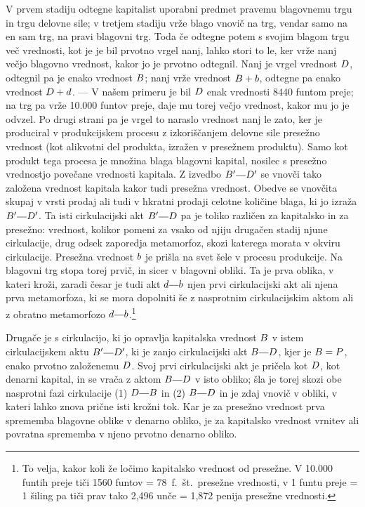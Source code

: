 \documentclass[kapital_02.tex]{subfiles}
\begin{document}
V prvem stadiju odtegne kapitalist uporabni predmet pravemu blagovnemu trgu in trgu delovne sile; v tretjem stadiju vrže blago vnovič na trg, vendar samo na en sam trg, na pravi blagovni trg. Toda če odtegne potem s svojim blagom trgu več vrednosti, kot je je bil prvotno vrgel nanj, lahko stori to le, ker vrže nanj večjo blagovno vrednost, kakor jo je prvotno odtegnil. Nanj je vrgel vrednost \(D\), odtegnil pa je enako vrednost \(B\); nanj vrže vrednost \(B + b\), odtegne pa enako vrednost \(D + d\). --- V našem primeru je bil \(D\) enak vrednosti 8440 funtom preje; na trg pa vrže 10.000 funtov preje, daje mu torej večjo vrednost, kakor mu jo je odvzel. Po drugi strani pa je vrgel to naraslo vrednost nanj le zato, ker je produciral v produkcijskem procesu z izkoriščanjem delovne sile presežno vrednost (kot alikvotni del produkta, izražen v presežnem produktu). Samo kot produkt tega procesa je množina blaga blagovni kapital, nosilec s presežno vrednostjo povečane vrednosti kapitala. Z izvedbo \(\KPEB'\KPEcrta\KPED'\) se vnovči tako založena vrednost kapitala kakor tudi presežna vrednost. Obedve se vnovčita skupaj v vrsti prodaj ali tudi v hkratni prodaji celotne količine blaga, ki jo izraža \(\KPEB'\KPEcrta\KPED'\). Ta isti cirkulacijski akt \(\KPEB'\KPEcrta\KPED\) pa je toliko različen za kapitalsko in za presežno: vrednost, kolikor pomeni za vsako od njiju drugačen stadij njune cirkulacije, drug odsek zaporedja metamorfoz, skozi katerega morata v okviru cirkulacije. Presežna vrednost \(b\) je prišla na svet šele v procesu produkcije. Na blagovni trg stopa torej prvič, in sicer v blagovni obliki. Ta je prva oblika, v kateri kroži, zaradi česar je tudi akt \(\KPEd\KPEcrta\KPEb\) njen prvi cirkulacijski akt ali njena prva metamorfoza, ki se mora dopolniti še z nasprotnim cirkulacijskim aktom ali z obratno metamorfozo \(\KPEd\KPEcrta\KPEb\).\footnote{To velja, kakor koli že ločimo kapitalsko vrednost od presežne. V 10.000 funtih preje tiči 1560 funtov = 78~f.~št.\ presežne vrednosti, v 1 funtu preje = 1 šiling pa tiči prav tako 2,496 unče = 1,872 penija presežne vrednosti.}

Drugače je s cirkulacijo, ki jo opravlja kapitalska vrednost \(B\) v istem cirkulacijskem aktu \(\KPEB'\KPEcrta\KPED'\), ki je zanjo cirkulacijski akt \(\KPEB\KPEcrta\KPED\), kjer je \(B = P\), enako prvotno založenemu \(D\). Svoj prvi cirkulacijski akt je pričela kot \(D\), kot denarni kapital, in se vrača z aktom \(\KPEB\KPEcrta\KPED\) v isto obliko; šla je torej skozi obe nasprotni fazi cirkulacije (1) \(\KPED\KPEcrta\KPEB\) in (2) \(\KPEB\KPEcrta\KPED\) in je zdaj vnovič v obliki, v kateri lahko znova prične isti krožni tok. Kar je za presežno vrednost prva sprememba blagovne oblike v denarno obliko, je za kapitalsko vrednost vrnitev ali povratna sprememba v njeno prvotno denarno obliko.
\end{document}
